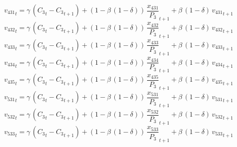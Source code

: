 \begin{dmath}
{{v_{431}}}_{t}={{\gamma}}\, \left({{C_{3}}}_{t}-{{C_{3}}}_{t+1}\right)+\left(1-{{\beta}}\, \left(1-{{\delta}}\right)\right)\, {{\frac{x_{431}}{P_{3}}}}_{t+1}+{{\beta}}\, \left(1-{{\delta}}\right)\, {{v_{431}}}_{t+1}
\end{dmath}
\begin{dmath}
{{v_{432}}}_{t}={{\gamma}}\, \left({{C_{3}}}_{t}-{{C_{3}}}_{t+1}\right)+\left(1-{{\beta}}\, \left(1-{{\delta}}\right)\right)\, {{\frac{x_{432}}{P_{3}}}}_{t+1}+{{\beta}}\, \left(1-{{\delta}}\right)\, {{v_{432}}}_{t+1}
\end{dmath}
\begin{dmath}
{{v_{433}}}_{t}={{\gamma}}\, \left({{C_{3}}}_{t}-{{C_{3}}}_{t+1}\right)+\left(1-{{\beta}}\, \left(1-{{\delta}}\right)\right)\, {{\frac{x_{433}}{P_{3}}}}_{t+1}+{{\beta}}\, \left(1-{{\delta}}\right)\, {{v_{433}}}_{t+1}
\end{dmath}
\begin{dmath}
{{v_{434}}}_{t}={{\gamma}}\, \left({{C_{3}}}_{t}-{{C_{3}}}_{t+1}\right)+\left(1-{{\beta}}\, \left(1-{{\delta}}\right)\right)\, {{\frac{x_{434}}{P_{3}}}}_{t+1}+{{\beta}}\, \left(1-{{\delta}}\right)\, {{v_{434}}}_{t+1}
\end{dmath}
\begin{dmath}
{{v_{435}}}_{t}={{\gamma}}\, \left({{C_{3}}}_{t}-{{C_{3}}}_{t+1}\right)+\left(1-{{\beta}}\, \left(1-{{\delta}}\right)\right)\, {{\frac{x_{435}}{P_{3}}}}_{t+1}+{{\beta}}\, \left(1-{{\delta}}\right)\, {{v_{435}}}_{t+1}
\end{dmath}
\begin{dmath}
{{v_{531}}}_{t}={{\gamma}}\, \left({{C_{3}}}_{t}-{{C_{3}}}_{t+1}\right)+\left(1-{{\beta}}\, \left(1-{{\delta}}\right)\right)\, {{\frac{x_{531}}{P_{3}}}}_{t+1}+{{\beta}}\, \left(1-{{\delta}}\right)\, {{v_{531}}}_{t+1}
\end{dmath}
\begin{dmath}
{{v_{532}}}_{t}={{\gamma}}\, \left({{C_{3}}}_{t}-{{C_{3}}}_{t+1}\right)+\left(1-{{\beta}}\, \left(1-{{\delta}}\right)\right)\, {{\frac{x_{532}}{P_{3}}}}_{t+1}+{{\beta}}\, \left(1-{{\delta}}\right)\, {{v_{532}}}_{t+1}
\end{dmath}
\begin{dmath}
{{v_{533}}}_{t}={{\gamma}}\, \left({{C_{3}}}_{t}-{{C_{3}}}_{t+1}\right)+\left(1-{{\beta}}\, \left(1-{{\delta}}\right)\right)\, {{\frac{x_{533}}{P_{3}}}}_{t+1}+{{\beta}}\, \left(1-{{\delta}}\right)\, {{v_{533}}}_{t+1}
\end{dmath}
